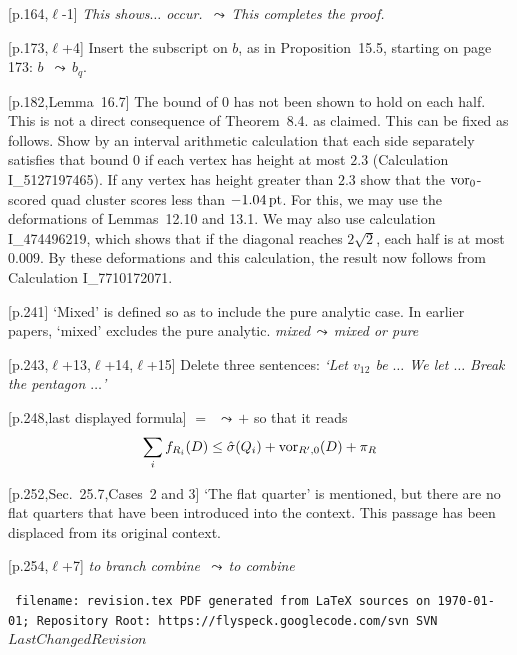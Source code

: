 \documentclass[11pt]{amsart}
\def\svninfo{{\tt
  filename: revision.tex\hfill\break
  PDF generated from LaTeX sources on \today; \hfill\break
  Repository Root: https://flyspeck.googlecode.com/svn \hfill\break
  SVN $LastChangedRevision$
  }
  }
\def\op#1{{\text{#1}}}
\def\lto{\ensuremath{\,\leadsto\,}}
\def\line{$\ell$}
\def\text{\hbox}
\def\sz{small} %
\def\rmx{\rm}
\begin{document}
\begin{\sz}
[p.164,\line-1] 
	{\it This shows$\ldots$ occur.
	\lto This completes the proof.}


[p.173,\line+4] {\rmx Insert the subscript on $b$,
as in Proposition~15.5, starting on page 173:}
   $b$ \lto $b_q$.



	
[p.182,Lemma~16.7]  {\rmx The bound of $0$ has not been
shown to hold on each half.  This is not a 
direct consequence
of Theorem~8.4. as claimed.
This can be fixed as follows.  Show by an interval arithmetic
calculation that each side separately satisfies
that bound $0$ if each vertex has height at most $2.3$ (Calculation I\_5127197465).
If any vertex has height greater than $2.3$ show that the $\op{vor}_0$-scored quad cluster scores
less than $-1.04\,\op{pt}$.  
For this, we may use the deformations of Lemmas~12.10 and 13.1.  We may also use calculation I\_474496219, which shows that if the diagonal reaches $2\sqrt2$, each half is at most $0.009$.  
By these deformations and this calculation, the result now follows from Calculation I\_7710172071.}


[p.241]  {\rmx `Mixed' is defined so as to include
the pure analytic case.  In earlier papers,
`mixed' excludes the pure analytic.  }
	{\it mixed\lto mixed or pure}
	
[p.243,\line+13,\line+14,\line+15]
	{\rmx Delete three sentences:}
	{\it `Let $v_{12}$ be $\ldots$  We let $\ldots$
	 Break the pentagon $\ldots$'}
	
[p.248,last displayed formula]  
	$=$ \lto $+$
{\rmx so that it reads}
	$$
	\sum_i f_{R_i}(D) \le \hat\sigma(Q_i) +
	\op{vor}_{R',0}(D) + \pi_R
	$$

[p.252,Sec.~25.7,Cases~2 and 3]  {\rmx `The flat quarter'
is mentioned, but there are no flat quarters
that have been introduced into the context.  
This passage
has been displaced from its original context.}

[p.254,\line+7]
{\it to branch combine \lto to combine}
\end{\sz}






\bigskip

\begin{\sz}
\svninfo
\end{\sz}
\end{document}
